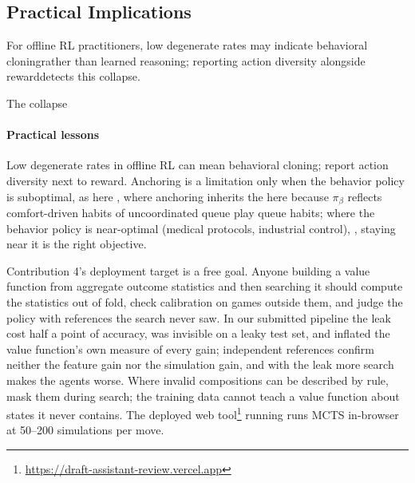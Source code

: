 \documentclass[journal]{IEEEtran}
\newcommand{\deployurl}{\url{https://draft-assistant-review.vercel.app}}
\newcommand{\deployurl}{\url{https://www.hotsfever.com}}
\providecommand{\DIFaddtex}[1]{{\protect\color{blue} \sf #1}} %
\providecommand{\DIFdeltex}[1]{{\protect\color{red} \scriptsize #1}} %
\providecommand{\DIFaddbegin}{} %
\providecommand{\DIFaddend}{} %
\providecommand{\DIFdelbegin}{} %
\providecommand{\DIFdelend}{} %
\providecommand{\DIFadd}[1]{\texorpdfstring{\DIFaddtex{#1}}{#1}} %
\providecommand{\DIFdel}[1]{\texorpdfstring{\DIFdeltex{#1}}{}} %
\begin{document}
\DIFdelbegin \subsection{\DIFdel{Practical Implications}}
\addtocounter{subsection}{-1}%

\DIFdel{For offline RL practitioners, low degenerate rates may indicate behavioral cloningrather than learned reasoning; reporting action diversity alongside rewarddetects this collapse. }%

\DIFdel{The collapse }\DIFdelend \DIFaddbegin \paragraph{\DIFadd{Practical lessons}} \DIFadd{Low degenerate rates in offline RL can mean behavioral cloning; report action diversity next to reward. Anchoring }\DIFaddend is a limitation \DIFdelbegin \DIFdel{only when the behavior policy is suboptimal, as here , where anchoring inherits the }\DIFdelend \DIFaddbegin \DIFadd{here because $\pi_\beta$ reflects }\DIFaddend comfort-driven \DIFdelbegin \DIFdel{habits of uncoordinated queue play}\DIFdelend \DIFaddbegin \DIFadd{queue habits}\DIFaddend ; where the behavior policy is near-optimal\DIFdelbegin \DIFdel{(medical protocols, industrial control), }\DIFdelend \DIFaddbegin \DIFadd{, }\DIFaddend staying near it is the right \DIFdelbegin \DIFdel{objective. }%

\DIFdel{Contribution 4's deployment target is a free }\DIFdelend \DIFaddbegin \DIFadd{goal. Anyone building a value function from aggregate outcome statistics and then searching it should compute the statistics out of fold, check calibration on games outside them, and judge the policy with references the search never saw. In our submitted pipeline the leak cost half a point of accuracy, was invisible on a leaky test set, and inflated the value function's own measure of every gain; independent references confirm neither the feature gain nor the simulation gain, and with the leak more search makes the agents worse. Where invalid compositions can be described by rule, mask them during search; the training data cannot teach a value function about states it never contains. The deployed }\DIFaddend web tool\footnote{\deployurl} \DIFdelbegin \DIFdel{running }\DIFdelend \DIFaddbegin \DIFadd{runs }\DIFaddend MCTS in-browser at 50--200 simulations per move. \DIFdelbegin %
\end{document}
